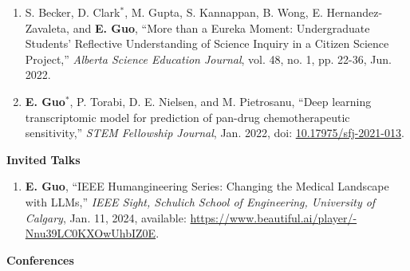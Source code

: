 \documentclass{article}
\begin{document}
\begin{enumerate}
    \item S. Becker, D. Clark$^*$, M. Gupta, S. Kannappan, B. Wong, E. Hernandez-Zavaleta, and \textbf{E. Guo}, ``More than a Eureka Moment: Undergraduate Students' Reflective Understanding of Science Inquiry in a Citizen Science Project,'' \textit{Alberta Science Education Journal}, vol. 48, no. 1, pp. 22-36, Jun. 2022.
    \item \textbf{E. Guo$^*$}, P. Torabi, D. E. Nielsen, and M. Pietrosanu, ``Deep learning transcriptomic model for prediction of pan-drug chemotherapeutic sensitivity,'' \textit{STEM Fellowship Journal}, Jan. 2022, doi: \href{https://doi.org/10.17975/sfj-2021-013}{10.17975/sfj-2021-013}.
\end{enumerate} \vspace{1em}

\textbf{Invited Talks} \vspace{.5em}

\begin{enumerate}
    \item \textbf{E. Guo}, ``IEEE Humangineering Series: Changing the Medical Landscape with LLMs,'' \textit{IEEE Sight, Schulich School of Engineering, University of Calgary}, Jan. 11, 2024, available: \href{https://www.beautiful.ai/player/-Nnu39LC0KXOwUhbIZ0E}{https://www.beautiful.ai/player/-Nnu39LC0KXOwUhbIZ0E}.
\end{enumerate} \vspace{1em}


\textbf{Conferences} \vspace{.5em}
\end{document}
